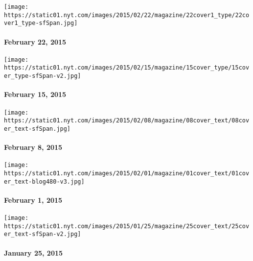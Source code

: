 \href{http://www.nytimes.com/indexes/2015/02/22/magazine/index.html}{}

\texttt{[image: https://static01.nyt.com/images/2015/02/22/magazine/22cover1\_type/22cover1\_type-sfSpan.jpg]}

\hypertarget{february-22-2015}{%
\paragraph{February 22, 2015}\label{february-22-2015}}

\href{http://www.nytimes.com/indexes/2015/02/15/magazine/index.html}{}

\texttt{[image: https://static01.nyt.com/images/2015/02/15/magazine/15cover\_type/15cover\_type-sfSpan-v2.jpg]}

\hypertarget{february-15-2015}{%
\paragraph{February 15, 2015}\label{february-15-2015}}

\href{http://www.nytimes.com/indexes/2015/02/08/magazine/index.html}{}

\texttt{[image: https://static01.nyt.com/images/2015/02/08/magazine/08cover\_text/08cover\_text-sfSpan.jpg]}

\hypertarget{february-8-2015}{%
\paragraph{February 8, 2015}\label{february-8-2015}}

\href{http://www.nytimes.com/indexes/2015/02/01/magazine/index.html}{}

\texttt{[image: https://static01.nyt.com/images/2015/02/01/magazine/01cover\_text/01cover\_text-blog480-v3.jpg]}

\hypertarget{february-1-2015}{%
\paragraph{February 1, 2015}\label{february-1-2015}}

\href{http://www.nytimes.com/indexes/2015/01/25/magazine/index.html}{}

\texttt{[image: https://static01.nyt.com/images/2015/01/25/magazine/25cover\_text/25cover\_text-sfSpan-v2.jpg]}

\hypertarget{january-25-2015}{%
\paragraph{January 25, 2015}\label{january-25-2015}}

